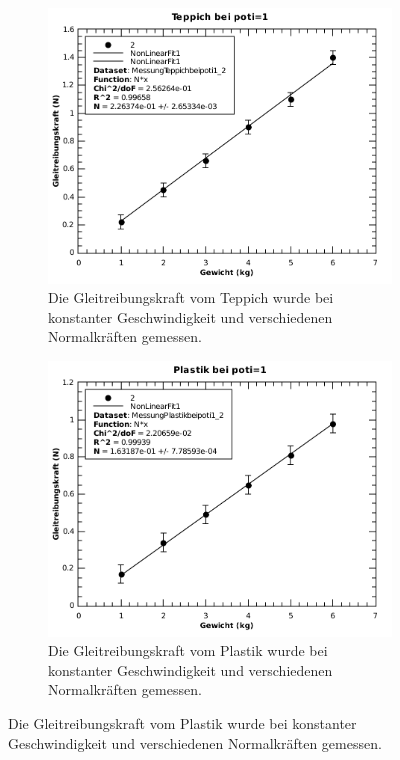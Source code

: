 \begin{figure}[H]
    \centering
    \begin{subfigure}{.7\textwidth}
        \includegraphics[width=\linewidth]{images/teppich_const_geschwindigkeit}
        \caption{Die Gleitreibungskraft vom Teppich wurde bei konstanter Geschwindigkeit und verschiedenen Normalkr\"aften gemessen.}
        \label{fig:teppich_const_geschwindigkeit}
    \end{subfigure}
    \begin{subfigure}{.7\textwidth}
        \includegraphics[width=\linewidth]{images/plastik_const_geschwindigkeit}
        \caption{Die Gleitreibungskraft vom Plastik wurde bei konstanter Geschwindigkeit und verschiedenen Normalkr\"aften gemessen.}
        \label{fig:plastik_const_geschwindigkeit}
    \end{subfigure}
\end{figure}

